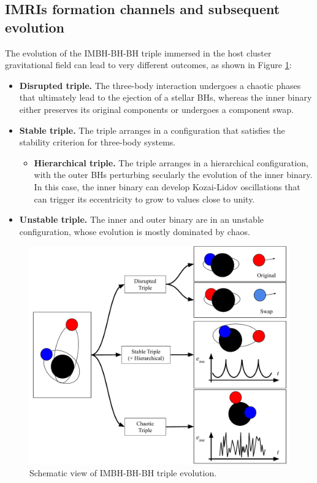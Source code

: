 \documentclass[twocolumn]{aastex62}
\begin{document}
\subsection{IMRIs formation channels and subsequent evolution}
\label{sec:imris}
The evolution of the IMBH-BH-BH triple immersed in the host cluster gravitational field can lead to very different outcomes, as shown in Figure \ref{fig:f3}:
\begin{itemize}
    \item {\bf Disrupted triple.} The three-body interaction undergoes a chaotic phases that ultimately lead to the ejection of a stellar BHs, whereas the inner binary either preserves its original components or undergoes a component swap.
    \item {\bf Stable triple.} The triple arranges in a configuration that satisfies the stability criterion for three-body systems. 
	\begin{itemize}
		\item {\bf Hierarchical triple.}  The triple arranges in a hierarchical configuration, with the outer BHs perturbing secularly the evolution of the inner binary. In this case, the inner binary can develop Kozai-Lidov oscillations \citep{kozai62,lidov62} that can trigger its eccentricity to grow to values close to unity. 
	\end{itemize}
    \item {\bf Unstable triple.} The inner and outer binary are in an unstable configuration, whose evolution is mostly dominated by chaos.
\end{itemize}

\begin{figure}
    \centering
    \includegraphics[width=16cm]{Sketch_IMRI}
    \caption{Schematic view of IMBH-BH-BH triple evolution.}
    \label{fig:f3}
\end{figure}
\end{document}
